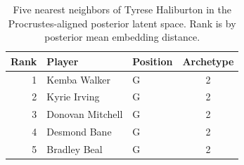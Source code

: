 \begin{table}[htbp]
  \centering\small
  \begin{tabular}{rllc}
    \toprule
    Rank & Player & Position & Archetype \\
    \midrule
    1 & Kemba Walker & G & 2 \\
    2 & Kyrie Irving & G & 2 \\
    3 & Donovan Mitchell & G & 2 \\
    4 & Desmond Bane & G & 2 \\
    5 & Bradley Beal & G & 2 \\
    \bottomrule
  \end{tabular}
  \caption{Five nearest neighbors of Tyrese Haliburton in the Procrustes-aligned posterior latent space. Rank is by posterior mean embedding distance.}
\end{table}

